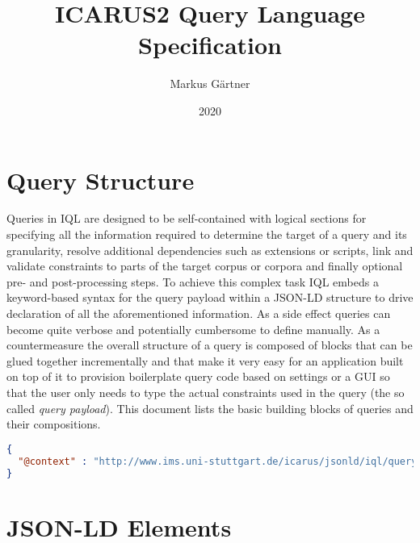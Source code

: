 \documentclass[11pt,a4paper,portrait]{article}
\title{ICARUS2 Query Language Specification}
\author{Markus Gärtner}
\date{2020}
\newcommand{\iql}{IQL\xspace}
\begin{document}
\maketitle

\tableofcontents

\section{Query Structure}
\label{sec:query-structure}

Queries in \iql are designed to be self-contained with logical sections for specifying all the information required to determine the target of a query and its granularity, resolve additional dependencies such as extensions or scripts, link and validate constraints to parts of the target corpus or corpora and finally optional pre- and post-processing steps.
To achieve this complex task \iql embeds a keyword-based syntax for the query payload within a JSON-LD structure to drive declaration of all the aforementioned information. 
As a side effect queries can become quite verbose and potentially cumbersome to define manually. 
As a countermeasure the overall structure of a query is composed of blocks that can be glued together incrementally and that make it very easy for an application built on top of it to provision boilerplate query code based on settings or a GUI so that the user only needs to type the actual constraints used in the query (the so called \textit{query payload}). 
This document lists the basic building blocks of queries and their compositions.

\begin{lstlisting}[language=json]
{
  "@context" : "http://www.ims.uni-stuttgart.de/icarus/jsonld/iql/query" 
}
\end{lstlisting}


\section{JSON-LD Elements}
\label{sec:elements}


\end{document}

